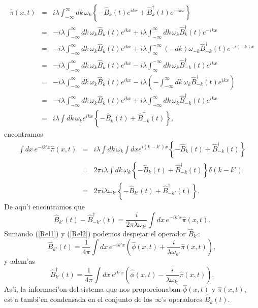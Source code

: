 \begin{eqnarray}
\hat{\pi}(x,t) & = &i\lambda\int_{-\infty}^{\infty} dk\,\omega_k\left\{
-\hat{B}_k(t) e^{ikx}+\hat{B}_k^\dagger (t)
e^{-ikx}\right\} \\
& = &-i\lambda\int_{-\infty}^{\infty}dk\,\omega_k\hat{B}_k(t)
e^{ikx}+i\lambda\int_{-\infty}^{\infty}dk\,\omega_k\hat{B}_k^\dagger \left(
t\right) e^{-ikx}\\
& = &-i\lambda\int_{-\infty}^{\infty}dk\,\omega_k\hat{B}_k(t)
e^{ikx}+i\lambda\int_{\infty}^{-\infty}\left( -dk\right) \omega_{-k}\hat
{B}_{-k}^\dagger (t) e^{-i( -k) x}\\
& = &-i\lambda\int_{-\infty}^{\infty}dk\,\omega_k\hat{B}_k(t)
e^{ikx}-i\lambda\int_{\infty}^{-\infty}dk\,\omega_k\hat{B}_{-k}^\dagger \left(
t\right) e^{ikx}\\
& = &-i\lambda\int_{-\infty}^{\infty}dk\,\omega_k\hat{B}_k(t)
e^{ikx}-i\lambda\left( -\int_{-\infty}^{\infty}dk\,\omega_k\hat{B}_{-k} 
^\dagger (t) e^{ikx}\right) \\
& = &-i\lambda\int_{-\infty}^{\infty}dk\,\omega_k\hat{B}_k(t)
e^{ikx}+i\lambda\int_{-\infty}^{\infty}dk\,\omega_k\hat{B}_{-k}^\dagger \left(
t\right) e^{ikx}\\
& = &i\lambda\int dk\,\omega_ke^{ikx}\left\{ -\hat{B}_k(t)
+\hat{B}_{-k}^\dagger (t) \right\} ,\label{piOperador2}
\end{eqnarray}
encontramos
\begin{eqnarray}
\int dx\,e^{-ik'x}\hat{\pi}(x,t) & = &i\lambda\int dk\,\omega_k\int
dxe^{i\left(
k-k'\right) x}\left\{ -\hat{B}_k(t) +\hat{B}_{-k}^\dagger (t) \right\} \\
& = &2\pi i\lambda\int dk\,\omega_k\left\{
-\hat{B}_k(t) +\hat{B}_{-k}^\dagger (t)\right\} \delta(k-k') \\
& = &2\pi i\lambda\omega_{k'}\left\{ -\hat{B}_{k'}(t) +\hat{B}_{-k'}^\dagger (t)
\right\}.
\end{eqnarray}
De aqu'i encontramos que
\begin{equation}
\hat{B}_{k'}(t) -\hat{B}_{-k'}^\dagger (t)  =
\frac{i}{2\pi\lambda\omega_{k'}}\int dx\, e^{-ik'x}\hat{\pi}(x,t) .\label{Rel2}
\end{equation}
Sumando (\ref{Rel1}) y (\ref{Rel2}) podemos despejar el operador $\hat{B}_{k'}$:
\begin{equation}
\hat{B}_{k'}(t)  = \frac{1}{4\pi}\int dx\, e^{-ik'x}\left( \hat{\phi}(x,t)
+\frac{i}{\lambda\omega_{k'}}\hat{\pi}(x,t) \right) ,\label{BOperador}
\end{equation}
y adem'as
\begin{equation}
\hat{B}_{k'}^\dagger (t) =\frac{1}{4\pi}\int dx\, e^{ik'x}\left( \hat{\phi}(x,t)
-\frac{i}{\lambda\omega_{k'}}\hat{\pi}(x,t) \right)  .\label{BdagOperador}
\end{equation}
As'i, la informaci'on del sistema que nos proporcionaban $\hat{\phi}(x,t) $ y
$\hat{\pi}(x,t) $, est'a tambi'en condensada en el conjunto de los $\infty$'s
operadores $\hat{B}_k(t)$.

